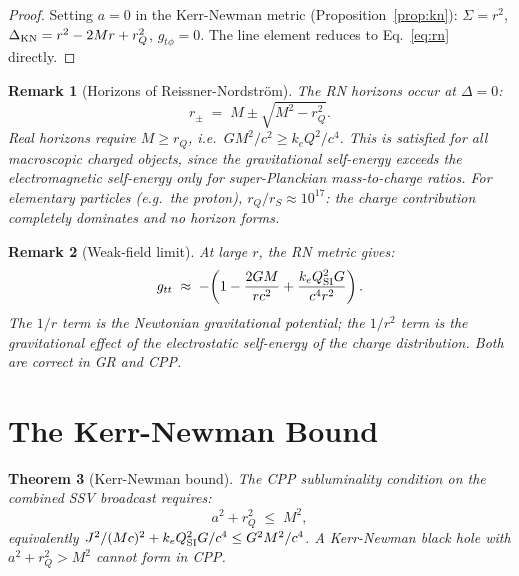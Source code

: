 \documentclass[12pt]{article}
\newtheorem{theorem}{Theorem}[section]
\newtheorem{remark}[theorem]{Remark}
\newcommand{\rQ}{r_Q}
\newcommand{\Sig}{\Sigma}
\newcommand{\Dlt}{\Delta}
\begin{document}
\begin{proof}
Setting $a = 0$ in the Kerr-Newman metric
(Proposition~\ref{prop:kn}): $\Sig = r^2$,
$\Dlt_{\rm KN} = r^2 - 2Mr + \rQ^2$, $g_{t\phi} = 0$.
The line element reduces to Eq.~\eqref{eq:rn} directly.
\end{proof}

\begin{remark}[Horizons of Reissner-Nordström]
The RN horizons occur at $\Dlt = 0$:
\begin{equation}
  r_\pm \;=\; M \pm \sqrt{M^2 - \rQ^2}.
  \label{eq:rn_horizons}
\end{equation}
Real horizons require $M \geq \rQ$, i.e.\ $GM^2/c^2 \geq k_e Q^2/c^4$.
This is satisfied for all macroscopic charged objects, since the
gravitational self-energy exceeds the electromagnetic self-energy only
for super-Planckian mass-to-charge ratios.  For elementary particles
(e.g.\ the proton), $r_Q/r_S \approx 10^{17}$: the charge contribution
completely dominates and no horizon forms.
\end{remark}

\begin{remark}[Weak-field limit]
At large $r$, the RN metric gives:
\begin{equation}
  g_{tt} \;\approx\; -\!\left(1 - \frac{2GM}{rc^2}
  + \frac{k_e Q_{\rm SI}^2 G}{c^4 r^2}\right).
  \label{eq:rn_weakfield}
\end{equation}
The $1/r$ term is the Newtonian gravitational potential; the $1/r^2$
term is the gravitational effect of the electrostatic self-energy of
the charge distribution.  Both are correct in GR and CPP.
\end{remark}

\section{The Kerr-Newman Bound}
\label{sec:kn_bound}

\begin{theorem}[Kerr-Newman bound]
\label{thm:kn_bound}
The CPP subluminality condition on the combined SSV broadcast requires:
\begin{equation}
  a^2 + \rQ^2 \;\leq\; M^2,
  \label{eq:kn_bound}
\end{equation}
equivalently $J^2/(Mc)^2 + k_e Q_{\rm SI}^2 G/c^4 \leq G^2M^2/c^4$.
A Kerr-Newman black hole with $a^2 + \rQ^2 > M^2$ cannot form in CPP.
\end{theorem}
\end{document}
